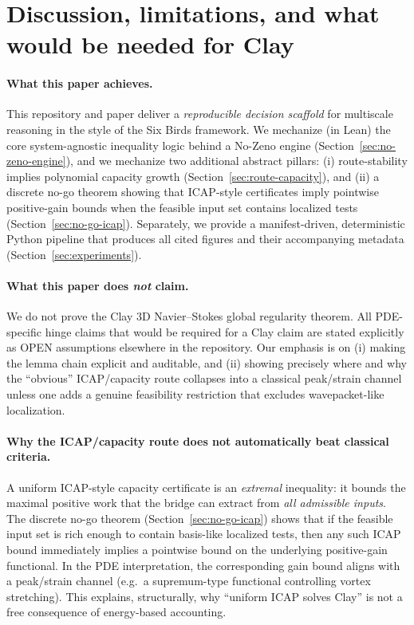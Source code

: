 \documentclass[11pt]{article}
\begin{document}
 \section{Discussion, limitations, and what would be needed for Clay}\label{sec:discussion}

\paragraph{What this paper achieves.}
This repository and paper deliver a \emph{reproducible decision scaffold} for multiscale reasoning
in the style of the Six Birds framework.
We mechanize (in Lean) the core system-agnostic inequality logic behind a No-Zeno engine
(Section~\ref{sec:no-zeno-engine}), and we mechanize two additional abstract pillars:
(i) route-stability implies polynomial capacity growth (Section~\ref{sec:route-capacity}),
and (ii) a discrete no-go theorem showing that ICAP-style certificates imply pointwise
positive-gain bounds when the feasible input set contains localized tests
(Section~\ref{sec:no-go-icap}).
Separately, we provide a manifest-driven, deterministic Python pipeline that produces
all cited figures and their accompanying metadata (Section~\ref{sec:experiments}).

\paragraph{What this paper does \emph{not} claim.}
We do not prove the Clay 3D Navier--Stokes global regularity theorem.
All PDE-specific hinge claims that would be required for a Clay claim are stated explicitly
as OPEN assumptions elsewhere in the repository. Our emphasis is on (i) making the lemma chain
explicit and auditable, and (ii) showing precisely where and why the ``obvious'' ICAP/capacity
route collapses into a classical peak/strain channel unless one adds a genuine feasibility
restriction that excludes wavepacket-like localization.

\paragraph{Why the ICAP/capacity route does not automatically beat classical criteria.}
A uniform ICAP-style capacity certificate is an \emph{extremal} inequality: it bounds the maximal
positive work that the bridge can extract from \emph{all admissible inputs}.
The discrete no-go theorem (Section~\ref{sec:no-go-icap}) shows that if the feasible input set
is rich enough to contain basis-like localized tests, then any such ICAP bound immediately implies
a pointwise bound on the underlying positive-gain functional. In the PDE interpretation, the
corresponding gain bound aligns with a peak/strain channel (e.g.\ a supremum-type functional
controlling vortex stretching). This explains, structurally, why ``uniform ICAP solves Clay''
is not a free consequence of energy-based accounting.
\end{document}

